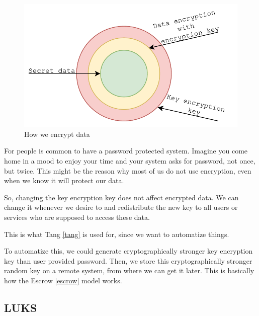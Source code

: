 \documentclass[../xdudla00-porting-Tang-to-Open-WRT.tex]{subfiles}
\begin{document}
\begin{figure}[h]
    \centering
    \includegraphics[scale=0.7]{figures/HowWeEncryptData.pdf}
    \caption{How we encrypt data}
    \label{fig:encdata}
\end{figure}

For people is common to have a password protected system.
Imagine you come home in a mood to enjoy your time and your system asks for password, not once, but twice.
This might be the reason why most of us do not use encryption, even when we know it will protect our data.


So, changing the key encryption key does not affect encrypted data.
We can change it whenever we desire to and redistribute the new key to all users or services who are supposed to access these data.

This is what Tang \ref{tang} is used for, since we want to automatize things.

To automatize this, we could generate cryptographically stronger key encryption key than user provided password.
Then, we store this cryptographically stronger random key on a remote system, from where we can get it later.
This is basically how the Escrow \ref{escrow} model works.

\subsection{LUKS}
\end{document}
